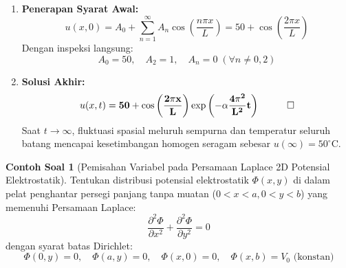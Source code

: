 \documentclass[11pt,a4paper]{article}
\theoremstyle{definition}
\newtheorem{example}{Contoh Soal}[section]
\begin{document}
\begin{enumerate}[leftmargin=*]
    \item \textbf{Penerapan Syarat Awal:}
    \begin{equation*}
        u(x, 0) = A_0 + \sum_{n=1}^{\infty} A_n \cos\left(\frac{n\pi x}{L}\right) = 50 + \cos\left(\frac{2\pi x}{L}\right)
    \end{equation*}
    Dengan inspeksi langsung:
    \begin{equation*}
        A_0 = 50, \quad A_2 = 1, \quad A_n = 0 \; (\forall n \ne 0, 2)
    \end{equation*}
    
    \item \textbf{Solusi Akhir:}
    \begin{equation*}
        u(x, t) = \mathbf{50 + \cos\left(\frac{2\pi x}{L}\right) \exp\left( -\alpha \frac{4\pi^2}{L^2} t \right)} \quad \qed
    \end{equation*}
    Saat $t \to \infty$, fluktuasi spasial meluruh sempurna dan temperatur seluruh batang mencapai kesetimbangan homogen seragam sebesar $u(\infty) = 50^\circ\text{C}$.
\end{enumerate}

\begin{example}[Pemisahan Variabel pada Persamaan Laplace 2D Potensial Elektrostatik]
Tentukan distribusi potensial elektrostatik $\Phi(x, y)$ di dalam pelat penghantar persegi panjang tanpa muatan ($0 < x < a, 0 < y < b$) yang memenuhi Persamaan Laplace:
\begin{equation*}
    \frac{\partial^2 \Phi}{\partial x^2} + \frac{\partial^2 \Phi}{\partial y^2} = 0
\end{equation*}
dengan syarat batas Dirichlet:
\begin{equation*}
    \Phi(0, y) = 0, \quad \Phi(a, y) = 0, \quad \Phi(x, 0) = 0, \quad \Phi(x, b) = V_0\text{ (konstan)}
\end{equation*}
\end{example}
\end{document}
